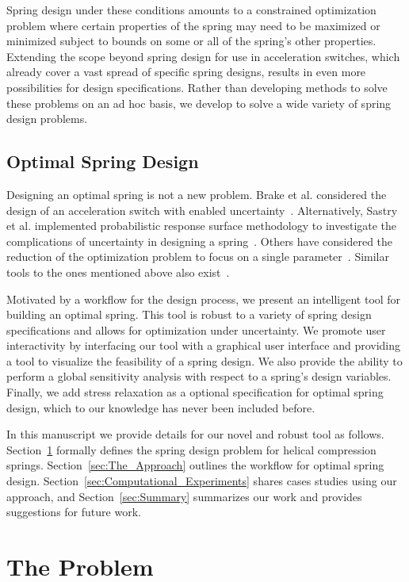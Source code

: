 \documentclass[10pt]{article}
\begin{document}
Spring design under these conditions amounts to a constrained optimization problem where certain properties of the spring may need to be maximized or minimized subject to bounds on some or all of the spring's other properties. Extending the scope beyond spring design for use in acceleration switches, which already cover a vast spread of specific spring designs, results in even more possibilities for design specifications. Rather than developing methods to solve these problems on an ad hoc basis, we develop to solve a wide variety of spring design problems. 

\subsection{Optimal Spring Design}
\label{subsec:Spring Design} 

Designing an optimal spring is not a new problem. Brake et al. considered the design of an acceleration switch with enabled uncertainty~\cite{IMSM2010}. Alternatively, Sastry et al. implemented probabilistic response surface methodology to investigate the complications of uncertainty in designing a spring~\cite{Reliability}. Others have considered the reduction of the optimization problem to focus on a single parameter~\cite{Robust}. Similar tools to the ones mentioned above also exist~\cite{Paredes}.

Motivated by a workflow for the design process, we present an intelligent tool for building an optimal spring. This tool is robust to a variety of spring design specifications and allows for optimization under uncertainty. We promote user interactivity by interfacing our tool with a graphical user interface and providing a tool to visualize the feasibility of a spring design. We also provide the ability to perform a global sensitivity analysis with respect to a spring's design variables. Finally, we add stress relaxation as a optional specification for optimal spring design, which to our knowledge has never been included before. 

In this manuscript we provide details for our novel and robust tool as follows. Section~\ref{sec:The_Problem} formally defines the spring design problem for helical compression springs. Section~\ref{sec:The_Approach} outlines the workflow for optimal spring design. Section~\ref{sec:Computational_Experiments} shares cases studies using our approach, and Section~\ref{sec:Summary} summarizes our work and provides suggestions for future work.

			
\section{The Problem} 
\label{sec:The_Problem}
\end{document}
